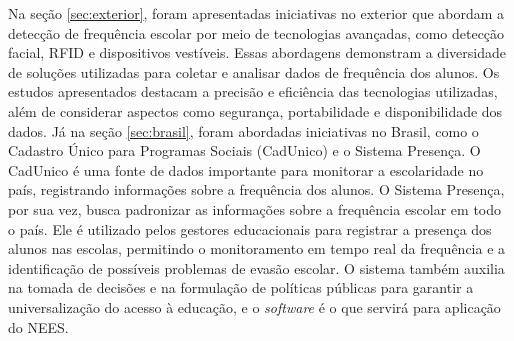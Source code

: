 Na seção \ref{sec:exterior}, foram apresentadas iniciativas no exterior que abordam a detecção de frequência escolar por meio de tecnologias avançadas, como detecção facial, RFID e dispositivos vestíveis. Essas abordagens demonstram a diversidade de soluções utilizadas para coletar e analisar dados de frequência dos alunos. Os estudos apresentados destacam a precisão e eficiência das tecnologias utilizadas, além de considerar aspectos como segurança, portabilidade e disponibilidade dos dados. Já na seção \ref{sec:brasil}, foram abordadas iniciativas no Brasil, como o Cadastro Único para Programas Sociais (CadUnico) e o Sistema Presença. O CadUnico é uma fonte de dados importante para monitorar a escolaridade no país, registrando informações sobre a frequência dos alunos. O Sistema Presença, por sua vez, busca padronizar as informações sobre a frequência escolar em todo o país. Ele é utilizado pelos gestores educacionais para registrar a presença dos alunos nas escolas, permitindo o monitoramento em tempo real da frequência e a identificação de possíveis problemas de evasão escolar. O sistema também auxilia na tomada de decisões e na formulação de políticas públicas para garantir a universalização do acesso à educação, e o \textit{software} é o que servirá para aplicação do NEES.